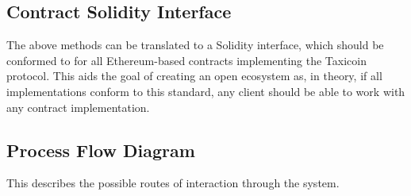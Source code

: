 

\subsection{Contract Solidity Interface}

The above methods can be translated to a Solidity interface, which should be conformed to for all Ethereum-based contracts implementing the Taxicoin protocol. This aids the goal of creating an open ecosystem as, in theory, if all implementations conform to this standard, any client should be able to work with any contract implementation.



\pagebreak
\subsection{Process Flow Diagram}

This describes the possible routes of interaction through the system.

